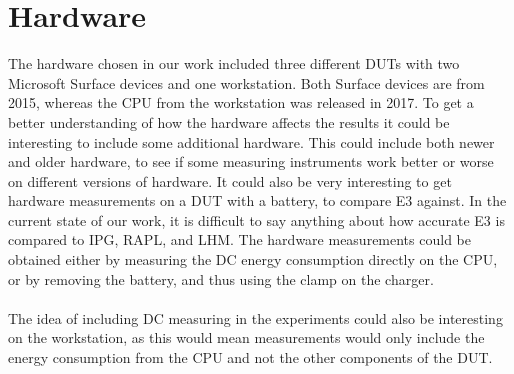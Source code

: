 \section{Hardware}

The hardware chosen in our work included three different DUTs with two Microsoft Surface devices and one workstation. Both Surface devices are from 2015, whereas the CPU from the workstation was released in 2017. To get a better understanding of how the hardware affects the results it could be interesting to include some additional hardware. This could include both newer and older hardware, to see if some measuring instruments work better or worse on different versions of hardware. It could also be very interesting to get hardware measurements on a DUT with a battery, to compare E3 against. In the current state of our work, it is difficult to say anything about how accurate E3 is compared to IPG, RAPL, and LHM. The hardware measurements could be obtained either by measuring the DC energy consumption directly on the CPU, or by removing the battery, and thus using the clamp on the charger.

\paragraph*{}
The idea of including DC measuring in the experiments could also be interesting on the workstation, as this would mean measurements would only include the energy consumption from the CPU and not the other components of the DUT.